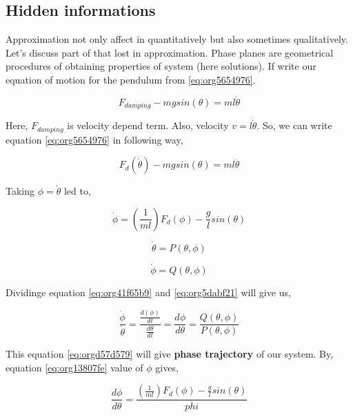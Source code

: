 \documentclass[11pt,a4paper]{article}
\begin{document}
\subsection{Hidden informations}
\label{sec:orgb180ce9}

Approximation not only affect in quantitatively but also sometimes qualitatively. Let's discuss part of that lost in approximation. Phase planes are geometrical procedures of obtaining properties of system (here solutions). If write our equation of motion for the pendulum from \ref{eq:org5654976}.

\begin{equation*}
\label{eq:org56439d1}
F_{damping}-mgsin(\theta)=ml\ddot{\theta}
\end{equation*}

Here, \(F_{damping}\) is velocity depend term. Also, velocity \(v=l\dot{\theta}\). So, we can write equation \ref{eq:org5654976} in following way,


\begin{equation*}
\label{eq:org53aef96}
F_{d}(\dot{\theta})-mgsin(\theta)=ml\ddot{\theta}
\end{equation*}

Taking \(\phi=\dot{\theta}\) led to,

\begin{equation}
\label{eq:org13807fe}
\dot{\phi}=(\frac{1}{ml})F_{d}(\phi)-\frac{g}{l}sin(\theta)
\end{equation}

\begin{equation}
\label{eq:org5dabf21}
\dot{\theta} = P(\theta,\phi)
\end{equation}

\begin{equation}
\label{eq:org41f65b9}
\dot{\phi} = Q(\theta,\phi)
\end{equation}

Dividinge equation \ref{eq:org41f65b9} and \ref{eq:org5dabf21} will give us,

\begin{equation}
\label{eq:orgd57d579}
\frac{\dot{\phi}}{\dot{\theta}}= \frac{\frac{d(\phi)}{dt}}{\frac{d{\theta}}{dt}} = \frac{d\phi}{d\theta}= \frac{Q(\theta,\phi)}{P(\theta,\phi)}
\end{equation}

This equation \ref{eq:orgd57d579} will give \textbf{phase trajectory} of our system. By, equation \ref{eq:org13807fe} value of \(\phi\) gives,

\begin{equation}
\label{eq:org59e755d}
\frac{d\phi}{d\theta}=\frac{(\frac{1}{ml})F_{d}(\phi)-\frac{g}{l}sin(\theta)}{phi}
\end{equation}
\end{document}
